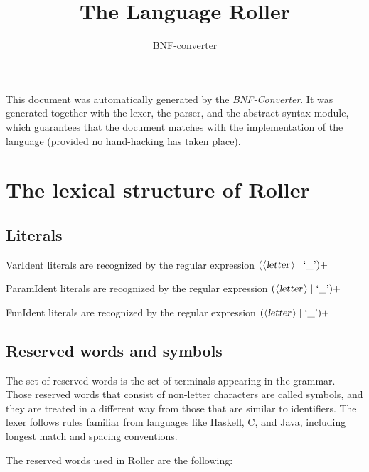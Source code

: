 \documentclass[a4paper,11pt]{article}
\author{BNF-converter}
\title{The Language Roller}
\begin{document}
\maketitle

\newcommand{\emptyP}{\mbox{$\epsilon$}}
\newcommand{\terminal}[1]{\mbox{{\texttt {#1}}}}
\newcommand{\nonterminal}[1]{\mbox{$\langle \mbox{{\sl #1 }} \! \rangle$}}
\newcommand{\arrow}{\mbox{::=}}
\newcommand{\delimit}{\mbox{$|$}}
\newcommand{\reserved}[1]{\mbox{{\texttt {#1}}}}
\newcommand{\literal}[1]{\mbox{{\texttt {#1}}}}
\newcommand{\symb}[1]{\mbox{{\texttt {#1}}}}

This document was automatically generated by the {\em BNF-Converter}. It was generated together with the lexer, the parser, and the abstract syntax module, which guarantees that the document matches with the implementation of the language (provided no hand-hacking has taken place).

\section*{The lexical structure of Roller}

\subsection*{Literals}






VarIdent literals are recognized by the regular expression
\(({\nonterminal{letter}} \mid \mbox{`\_'})+\)

ParamIdent literals are recognized by the regular expression
\(({\nonterminal{letter}} \mid \mbox{`\_'})+\)

FunIdent literals are recognized by the regular expression
\(({\nonterminal{letter}} \mid \mbox{`\_'})+\)


\subsection*{Reserved words and symbols}
The set of reserved words is the set of terminals appearing in the grammar. Those reserved words that consist of non-letter characters are called symbols, and they are treated in a different way from those that are similar to identifiers. The lexer follows rules familiar from languages like Haskell, C, and Java, including longest match and spacing conventions.

The reserved words used in Roller are the following: \\
\end{document}
